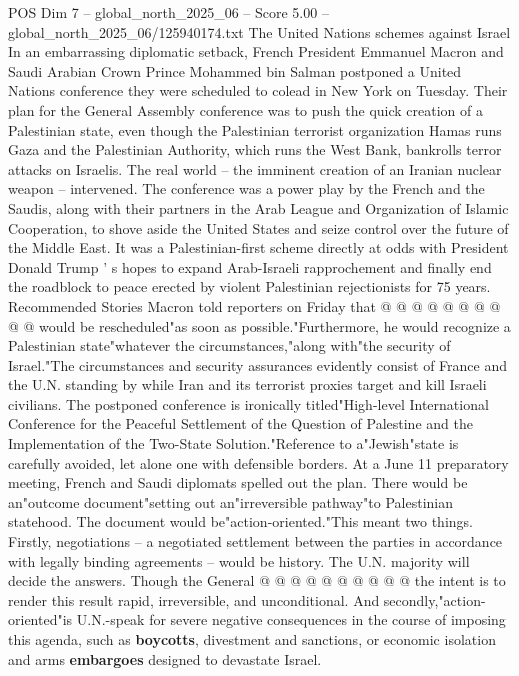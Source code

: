 \begin{textsample}{POS Dim 7 – global\_north\_2025\_06 – Score 5.00 – global\_north\_2025\_06/125940174.txt}  \label{ex:f7_pos_379}
The United Nations schemes against Israel In an embarrassing diplomatic setback, French President Emmanuel Macron and Saudi Arabian Crown Prince Mohammed bin Salman postponed a United Nations conference they were scheduled to colead in New York on Tuesday.
Their plan for the General Assembly conference was to push the quick creation of a Palestinian state, even though the Palestinian terrorist organization Hamas runs Gaza and the Palestinian Authority, which runs the West Bank, bankrolls terror attacks on Israelis.
The real world -- the imminent creation of an Iranian nuclear weapon -- intervened.
The conference was a power play by the French and the Saudis, along with their partners in the Arab League and Organization of Islamic Cooperation, to shove aside the United States and seize control over the future of the Middle East.
It was a Palestinian-first scheme directly at odds with President Donald Trump ' s hopes to expand Arab-Israeli rapprochement and finally end the roadblock to peace erected by violent Palestinian rejectionists for 75 years.
Recommended Stories Macron told reporters on Friday that @ @ @ @ @ @ @ @ @ @ would be rescheduled"as soon as possible."Furthermore, he would recognize a Palestinian state"whatever the circumstances,"along with"the security of Israel."The circumstances and security assurances evidently consist of France and the U.N. standing by while Iran and its terrorist proxies target and kill Israeli civilians.
The postponed conference is ironically titled"High-level International Conference for the Peaceful Settlement of the Question of Palestine and the Implementation of the Two-State Solution."Reference to a"Jewish"state is carefully avoided, let alone one with defensible borders.
At a June 11 preparatory meeting, French and Saudi diplomats spelled out the plan.
There would be an"outcome document"setting out an"irreversible pathway"to Palestinian statehood.
The document would be"action-oriented."This meant two things.
Firstly, negotiations -- a negotiated settlement between the parties in accordance with legally binding agreements -- would be history.
The U.N. majority will decide the answers.
Though the General @ @ @ @ @ @ @ @ @ @ the intent is to render this result rapid, irreversible, and unconditional.
And secondly,"action-oriented"is U.N.-speak for severe negative consequences in the course of imposing this agenda, such as \textbf{boycotts}, divestment and sanctions, or economic isolation and arms \textbf{embargoes} designed to devastate Israel.

\end{textsample}
